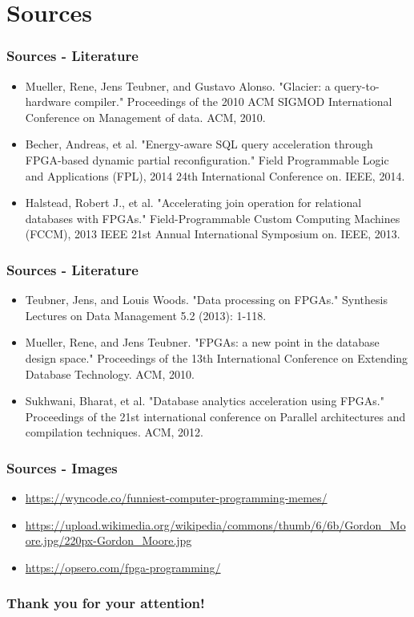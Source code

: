 \documentclass{beamer}
\begin{document}
\section{Sources}
\begin{frame}
	\frametitle{Sources - Literature}
	\begin{itemize}
		\item Mueller, Rene, Jens Teubner, and Gustavo Alonso. "Glacier: a query-to-hardware compiler." Proceedings of the 2010 ACM SIGMOD International Conference on Management of data. ACM, 2010.
		\item Becher, Andreas, et al. "Energy-aware SQL query acceleration through FPGA-based dynamic partial reconfiguration." Field Programmable Logic and Applications (FPL), 2014 24th International Conference on. IEEE, 2014.
		\item Halstead, Robert J., et al. "Accelerating join operation for relational databases with FPGAs." Field-Programmable Custom Computing Machines (FCCM), 2013 IEEE 21st Annual International Symposium on. IEEE, 2013.
	\end{itemize}
\end{frame}
\begin{frame}
\frametitle{Sources - Literature}
\begin{itemize}
	\item Teubner, Jens, and Louis Woods. "Data processing on FPGAs." Synthesis Lectures on Data Management 5.2 (2013): 1-118.
	\item Mueller, Rene, and Jens Teubner. "FPGAs: a new point in the database design space." Proceedings of the 13th International Conference on Extending Database Technology. ACM, 2010.
	\item Sukhwani, Bharat, et al. "Database analytics acceleration using FPGAs." Proceedings of the 21st international conference on Parallel architectures and compilation techniques. ACM, 2012.
\end{itemize}
\end{frame}

\begin{frame}
\frametitle{Sources - Images}
\begin{itemize}
	\item \url{https://wyncode.co/funniest-computer-programming-memes/}
	\item \url{https://upload.wikimedia.org/wikipedia/commons/thumb/6/6b/Gordon_Moore.jpg/220px-Gordon_Moore.jpg}
	\item \url{https://opsero.com/fpga-programming/}
\end{itemize}
\end{frame}
\begin{frame}
    \frametitle{Thank you for your attention!}
\end{frame}
\end{document}
